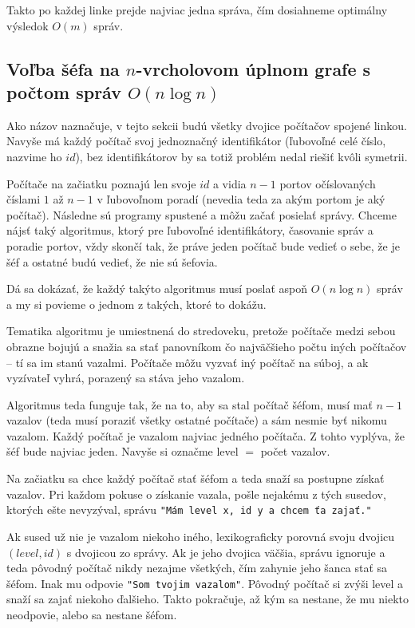 Takto po každej linke prejde najviac jedna správa, čím dosiahneme optimálny výsledok $O(m)$ správ.

\subsection{Voľba šéfa na $n$-vrcholovom úplnom grafe s počtom správ $O(n\log n)$}

Ako názov naznačuje, v tejto sekcii budú všetky dvojice počítačov spojené linkou. 
Navyše má každý počítač svoj jednoznačný identifikátor (ľubovoľné celé číslo, nazvime ho $id$), bez identifikátorov
by sa totiž problém nedal riešiť kvôli symetrii.

Počítače na začiatku poznajú len svoje $id$ a vidia $n-1$ portov očíslovaných číslami $1$ až $n-1$ v
ľubovoľnom poradí (nevedia teda za akým portom je aký počítač). Následne sú programy spustené a môžu začať posielať správy.
Chceme nájsť taký algoritmus, ktorý pre ľubovoľné identifikátory, časovanie správ a poradie
portov, vždy skončí tak, že práve jeden počítač bude vedieť o sebe, že je šéf a ostatné budú vedieť, že nie sú šefovia.

Dá sa dokázať, že každý takýto algoritmus musí poslať aspoň $O(n\log n)$ správ a my si povieme o
jednom z takých, ktoré to dokážu.

Tematika algoritmu je umiestnená do stredoveku, pretože počítače medzi sebou obrazne bojujú a snažia
sa stať panovníkom čo najväčšieho počtu iných počítačov -- tí sa im stanú vazalmi. 
Počítače môžu vyzvať iný počítač na súboj, a ak vyzívateľ vyhrá, porazený sa stáva jeho vazalom.

Algoritmus teda funguje tak, že na to, aby sa stal počítač šéfom, musí mať $n-1$ vazalov (teda musí
poraziť všetky ostatné počítače) a sám nesmie byť nikomu vazalom. Každý počítač je vazalom najviac 
jedného počítača. Z tohto vyplýva, že šéf bude najviac jeden. Navyše si označme level $=$ počet vazalov.

Na začiatku sa chce každý počítač stať šéfom a teda snaží sa postupne získať vazalov. Pri každom
pokuse o získanie vazala, pošle nejakému z tých susedov, ktorých ešte nevyzýval, správu \verb!"Mám level x, id y a chcem ťa zajať."! 

Ak sused už nie je vazalom niekoho iného, lexikograficky porovná svoju dvojicu $(level, id)$ s
dvojicou zo správy. 
Ak je jeho dvojica väčšia, správu ignoruje a teda pôvodný počítač nikdy nezajme všetkých, čím
zahynie jeho šanca stať sa šéfom. 
Inak mu odpovie \verb!"Som tvojim vazalom"!. Pôvodný počítač si zvýši level a snaží sa zajať niekoho
ďalšieho. Takto pokračuje, až kým sa nestane, že mu niekto neodpovie, alebo sa nestane šéfom.

